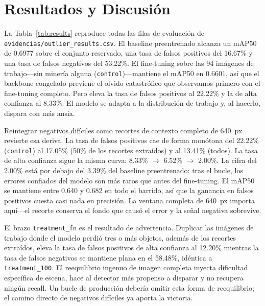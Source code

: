 \documentclass[conference]{IEEEtran}
\begin{document}
\section{Resultados y Discusión}
La Tabla~\ref{tab:results} reproduce todas las filas de evaluación de
\texttt{evidencias/outlier\_results.csv}. El baseline preentrenado alcanza un
mAP50 de 0.6977 sobre el conjunto reservado, una tasa de falsos positivos del
16.67\% y una tasa de falsos negativos del 53.22\%. El fine-tuning sobre las
94 imágenes de trabajo---sin minería alguna (\texttt{control})---mantiene el
mAP50 en 0.6601, así que el backbone congelado previene el olvido catastrófico
que observamos primero con el fine-tuning completo. Pero eleva la tasa de
falsos positivos al 22.22\% y la de alta confianza al 8.33\%. El modelo se
adapta a la distribución de trabajo y, al hacerlo, dispara con más ansia.

Reintegrar negativos difíciles como recortes de contexto completo de 640~px
revierte esa deriva. La tasa de falsos positivos cae de forma monótona del
22.22\% (\texttt{control}) al 17.05\% (50\% de los recortes extraídos) y al
13.41\% (todos). La tasa de alta confianza sigue la misma curva: 8.33\%
\(\rightarrow\) 6.52\% \(\rightarrow\) 2.00\%. La cifra del 2.00\% está por
debajo del 3.39\% del baseline preentrenado: tras el bucle, los errores
confiados del modelo son más raros que antes del fine-tuning. El mAP50 se
mantiene entre 0.640 y 0.682 en todo el barrido, así que la ganancia en falsos
positivos cuesta casi nada en precisión. La ventana completa de 640~px importa
aquí---el recorte conserva el fondo que causó el error y la señal negativa
sobrevive.

El brazo \texttt{treatment\_fn} es el resultado de advertencia. Duplicar las
imágenes de trabajo donde el modelo perdió tres o más objetos, además de los
recortes extraídos, eleva la tasa de falsos positivos de alta confianza al
12.20\% mientras la tasa de falsos negativos se mantiene plana en el 58.48\%,
idéntica a \texttt{treatment\_100}. El reequilibrio ingenuo de imagen completa
inyecta dificultad específica de escena, hace al detector más propenso a
disparar y no recupera ningún recall. Un bucle de producción debería omitir
esta forma de reequilibrio; el camino directo de negativos difíciles ya aporta
la victoria.
\end{document}
